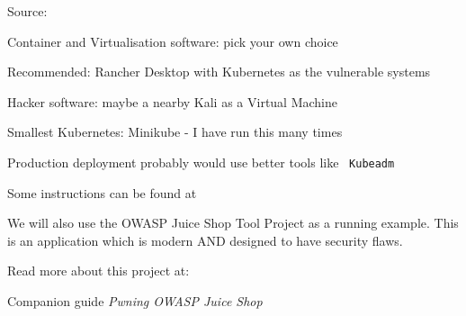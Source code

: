 \documentclass[Screen16to9,17pt]{foils}
\begin{document}




Source:





\begin{list2}
\item Container and Virtualisation software: pick your own choice
\item Recommended: Rancher Desktop with Kubernetes as the vulnerable systems
\item Hacker software: maybe a nearby Kali as a Virtual Machine 
\item Smallest Kubernetes: Minikube -  I have run this many times
\item Production deployment probably would use better tools like \faWrench\ \verb+Kubeadm+
\item Some instructions can be found at 
\end{list2}





We will also use the OWASP Juice Shop Tool Project as a running example. This is an application which is modern AND designed to have security flaws.

Read more about this project at: \\ 

Companion guide \emph{Pwning OWASP Juice Shop} 



\end{document}

